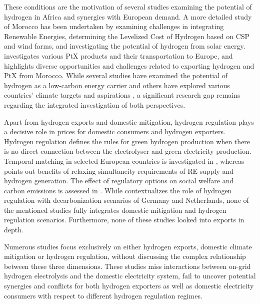 These conditions are the motivation of several studies \cite{vanWijk2021, AbouSeada2022, vanderZwaan2021, Schellekens2010, Cavana2021, Touili2022, Timmerberg2019a, Sens2022} examining the potential of hydrogen in Africa and synergies with European demand. A more detailed study of Morocco has been undertaken by \cite{Boulakhbar2020} examining challenges in integrating Renewable Energies, \cite{Khouya2020} determining the Levelized Cost of Hydrogen based on CSP and wind farms, and \cite{Touili2018} investigating the potential of hydrogen from solar energy. \cite{Hampp2021} investigates various PtX products and their transportation to Europe, and \cite{Eichhammer2019} highlights diverse opportunities and challenges related to exporting hydrogen and PtX from Morocco. While several studies \cite{Hampp2021, AbouSeada2022, vanWijk2021} have examined the potential of hydrogen as a low-carbon energy carrier and others have explored various countries' climate targets and aspirations \cite{Boulakhbar2020}, a significant research gap remains regarding the integrated investigation of both perspectives. 


Apart from hydrogen exports and domestic mitigation, hydrogen regulation plays a decisive role in prices for domestic consumers and hydrogen exporters. 
Hydrogen regulation defines the rules for green hydrogen production when there is no direct connection between the electrolyser and green electricity production.
Temporal matching in selected European countries is investigated in \cite{Zeyen2022}, whereas \cite{Ruhnau2023a} points out benefits of relaxing simultaneity requirements of RE supply and hydrogen generation. 
The effect of regulatory options on social welfare and carbon emissions is assessed in \cite{Brauer2022}. 
While \cite{Zeyen2022} contextualizes the role of hydrogen regulation with decarbonization scenarios of Germany and Netherlands, none of the mentioned studies fully integrates domestic mitigation and hydrogen regulation scenarios. Furthermore, none of these studies looked into exports in depth.

Numerous studies focus exclusively on either hydrogen exports, domestic climate mitigation or hydrogen regulation, without discussing the complex relationship between these three dimensions. These studies miss interactions between on-grid hydrogen electrolysis and the domestic electricity system, fail to uncover potential synergies and conflicts for both hydrogen exporters as well as domestic electricity consumers with respect to different hydrogen regulation regimes.

